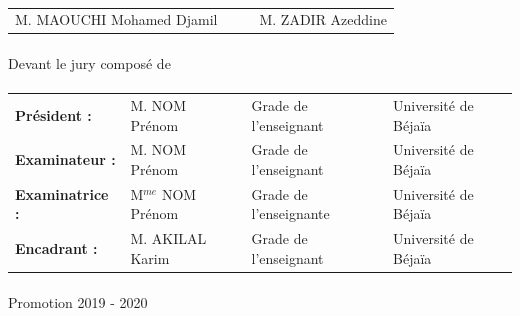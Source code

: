 \begin{titlepage}
\begin{center}
\paragraph{}

\begin{tabular}{l l l l}	

		M. MAOUCHI Mohamed Djamil 					& & & 		M. ZADIR Azeddine \\
								
			
		
		
		
\end{tabular}
		
\paragraph{}

\large Devant le jury composé de

\end{center}
  
\paragraph{}
  
\begin{table}[h!]
\begin{center}
        \begin{tabular}{l l l l}
				\textbf{Président :} & M. NOM Prénom & Grade de l'enseignant & Université de Béjaïa \\
				
				\textbf{Examinateur :} & M. NOM Prénom & Grade de l'enseignant & Université de Béjaïa \\
				
				\textbf{Examinatrice :} & M$^{me}$ NOM Prénom & Grade de l'enseignante & Université de Béjaïa \\
				
				\textbf{Encadrant :} & M. AKILAL Karim & Grade de l'enseignant & Université de Béjaïa \\
				
        \end{tabular}    
\end{center}

\end{table}

\paragraph{}

\begin{center} Promotion 2019 - 2020 \end{center}


\end{titlepage}
